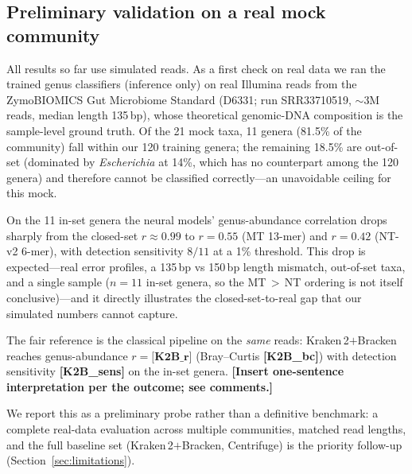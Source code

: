 %      

\subsection{Preliminary validation on a real mock community}
\label{sec:mock}

All results so far use simulated reads. As a first check on real data we ran the
trained genus classifiers (inference only) on real Illumina reads from the
ZymoBIOMICS Gut Microbiome Standard (D6331; run SRR33710519, $\sim$3M reads,
median length 135\,bp), whose theoretical genomic-DNA composition is the
sample-level ground truth. Of the 21 mock taxa, 11 genera (81.5\% of the
community) fall within our 120 training genera; the remaining 18.5\% are
out-of-set (dominated by \emph{Escherichia} at 14\%, which has no counterpart
among the 120 genera) and therefore cannot be classified correctly---an
unavoidable ceiling for this mock.

On the 11 in-set genera the neural models' genus-abundance correlation drops
sharply from the closed-set $r\approx0.99$ to $r=0.55$ (MT 13-mer) and $r=0.42$
(NT-v2 6-mer), with detection sensitivity $8/11$ at a 1\% threshold. This drop is
expected---real error profiles, a 135\,bp vs 150\,bp length mismatch, out-of-set
taxa, and a single sample ($n=11$ in-set genera, so the MT\,$>$\,NT ordering is
not itself conclusive)---and it directly illustrates the closed-set-to-real gap
that our simulated numbers cannot capture.

The fair reference is the classical pipeline on the \emph{same} reads:
Kraken\,2$+$Bracken reaches genus-abundance $r=\textbf{[K2B\_r]}$
(Bray--Curtis \textbf{[K2B\_bc]}) with detection sensitivity \textbf{[K2B\_sens]}
on the in-set genera.
\textbf{[Insert one-sentence interpretation per the outcome; see comments.]}

We report this as a preliminary probe rather than a definitive benchmark: a
complete real-data evaluation across multiple communities, matched read lengths,
and the full baseline set (Kraken\,2$+$Bracken, Centrifuge) is the priority
follow-up (Section~\ref{sec:limitations}).
